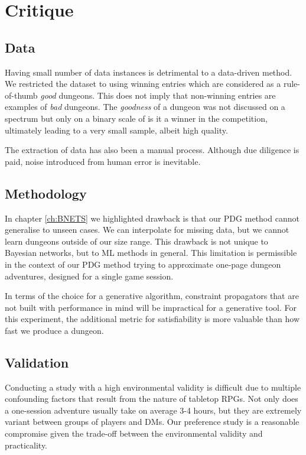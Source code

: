 \documentclass{UoYCSproject}
\begin{document}
\section{Critique}

\subsection{Data}
Having small number of data instances is detrimental to a data-driven method. We restricted the dataset to using winning entries which are considered as a rule-of-thumb \textit{good} dungeons. This does not imply that non-winning entries are examples of \textit{bad} dungeons. The \textit{goodness} of a dungeon was not discussed on a spectrum but only on a binary scale of is it a winner in the competition, ultimately leading to a very small sample, albeit high quality.

The extraction of data has also been a manual process. Although due diligence is paid, noise introduced from human error is inevitable.

\subsection{Methodology}
In chapter \ref{ch:BNETS} we highlighted drawback is that our PDG method cannot generalise to unseen cases. We can interpolate for missing data, but we cannot learn dungeons outside of our size range. This drawback is not unique to Bayesian networks, but to ML methods in general. This limitation is permissible in the context of our PDG method trying to approximate one-page dungeon adventures, designed for a single game session.

In terms of the choice for a generative algorithm, constraint propagators that are not built with performance in mind will be impractical for a generative tool. For this experiment, the additional metric for satisfiability is more valuable than how fast we produce a dungeon.

\subsection{Validation}
Conducting a study with a high environmental validity is difficult due to multiple confounding factors that result from the nature of tabletop RPGs. Not only does a one-session adventure usually take on average 3-4 hours, but they are extremely variant between groups of players and DMs. Our preference study is a reasonable compromise given the trade-off between the environmental validity and practicality.
\end{document}
